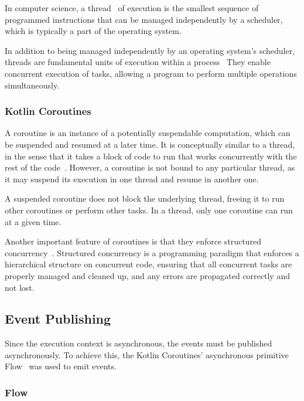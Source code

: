 In computer science, a thread~\cite{wiki:thread} of execution is the smallest sequence of programmed instructions that can be managed independently by a scheduler, which is typically a part of the operating system.

In addition to being managed independently by an operating system's scheduler, threads are fundamental units of execution within a process~\cite{wiki:process-computing}
They enable concurrent execution of tasks, allowing a program to perform multiple operations simultaneously.

\subsubsection{Kotlin Coroutines}\label{subsubsec:kotlin-coroutines}

A coroutine is an instance of a potentially suspendable computation, which can be suspended and resumed at a later time.
It is conceptually similar to a thread, in the sense that it takes a block of code to run that works concurrently with the rest of the code~\cite{kotlin-coroutines}.
However, a coroutine is not bound to any particular thread, as it may suspend its execution in one thread and resume in another one.

A suspended coroutine does not block the underlying thread, freeing it to run other coroutines or perform other tasks.
In a thread, only one coroutine can run at a given time.

Another important feature of coroutines is that they enforce structured concurrency~\cite{kotlin-coroutines}.
Structured concurrency is a programming paradigm that enforces a hierarchical structure on concurrent code, ensuring that all concurrent tasks are properly managed and cleaned up, and any errors are propagated correctly and not lost.

\subsection{Event Publishing}\label{subsec:event-publishing}

Since the execution context is asynchronous, the events must be published asynchronously.
To achieve this, the Kotlin Coroutines' asynchronous primitive Flow~\cite{kotlin-flow} was used to emit events.

\subsubsection{Flow}\label{subsubsec:flow}

